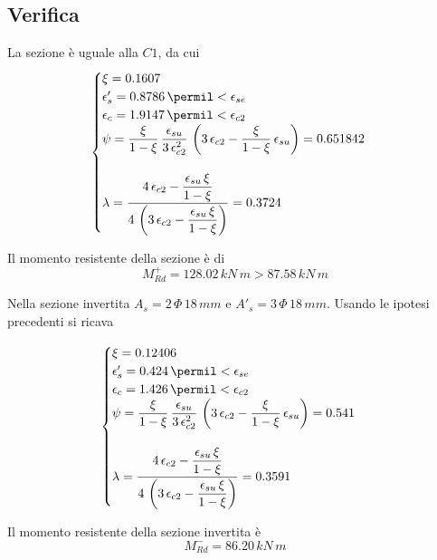 \subsection{Verifica}
La sezione è uguale alla $C1$, da cui
\[
\begin{cases}
	\xi = 0.1607\\
	\epsilon'_s = 0.8786\,\permil < \epsilon_{se}\\
	\epsilon_c = 1.9147\,\permil < \epsilon_{c2}\\
	\psi = \dfrac{\xi}{1-\xi}\,\dfrac{\epsilon_{su}}{3\,\epsilon_{c2}^2}\,\left(3\,\epsilon_{c2} - \dfrac{\xi}{1-\xi}\,\epsilon_{su}\right) = 0.651842\\\\
	\lambda = \dfrac{4\,\epsilon_{c2} - \dfrac{\epsilon_{su}\,\xi}{1-\xi}}{4\,\left(3\,\epsilon_{c2} - \dfrac{\epsilon_{su}\,\xi}{1-\xi}\right)} = 0.3724
\end{cases}
\]

Il momento resistente della sezione è di
\[
M_{Rd}^+ = 128.02\,kN\,m > 87.58\,kN\,m
\]

Nella sezione invertita $A_s = 2\,\Phi\,18\,mm$ e $A'_s = 3\,\Phi\,18\,mm$. Usando le ipotesi precedenti si ricava

\[
\begin{cases}
	\xi = 0.12406\\
	\epsilon'_s = 0.424\,\permil<\epsilon_{se}\\
	\epsilon_c = 1.426\,\permil < \epsilon_{c2}\\
	\psi = \dfrac{\xi}{1-\xi}\,\dfrac{\epsilon_{su}}{3\,\epsilon_{c2}^2}\,\left(3\,\epsilon_{c2} - \dfrac{\xi}{1-\xi}\,\epsilon_{su}\right) = 0.541\\\\
	\lambda = \dfrac{4\,\epsilon_{c2} - \dfrac{\epsilon_{su}\,\xi}{1-\xi}}{4\,\left(3\,\epsilon_{c2} - \dfrac{\epsilon_{su}\,\xi}{1-\xi}\right)} = 0.3591
\end{cases}
\]

Il momento resistente della sezione invertita è
\[
M_{Rd}^- = 86.20\,kN\,m
\]


